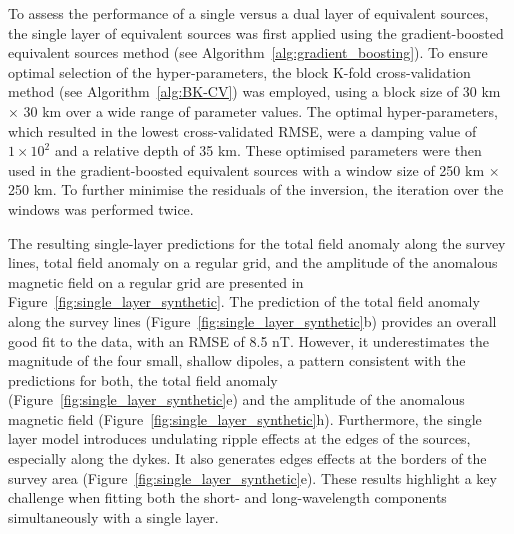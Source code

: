 To assess the performance of a single versus a dual layer of equivalent sources, the single layer of equivalent sources was first applied using the gradient-boosted equivalent sources method (see Algorithm~\ref{alg:gradient_boosting}). To ensure optimal selection of the hyper-parameters, the block K-fold cross-validation method (see Algorithm~\ref{alg:BK-CV}) was employed, using a block size of 30 km $\times$ 30 km over a wide range of parameter values. The optimal hyper-parameters, which resulted in the lowest cross-validated RMSE, were a damping value of $1 \times 10^{2}$ and a relative depth of 35 km. These optimised parameters were then used in the gradient-boosted equivalent sources with a window size of 250 km $\times$ 250 km. To further minimise the residuals of the inversion, the iteration over the windows was performed twice.

The resulting single-layer predictions for the total field anomaly along the survey lines, total field anomaly on a regular grid, and the amplitude of the anomalous magnetic field on a regular grid are presented in Figure~\ref{fig:single_layer_synthetic}. The prediction of the total field anomaly along the survey lines (Figure~\ref{fig:single_layer_synthetic}b) provides an overall good fit to the data, with an RMSE of 8.5 nT. However, it underestimates the magnitude of the four small, shallow dipoles, a pattern consistent with the predictions for both, the total field anomaly (Figure~\ref{fig:single_layer_synthetic}e) and the amplitude of the anomalous magnetic field (Figure~\ref{fig:single_layer_synthetic}h). Furthermore, the single layer model introduces undulating ripple effects at the edges of the sources, especially along the dykes. It also generates edges effects at the borders of the survey area (Figure~\ref{fig:single_layer_synthetic}e). These results highlight a key challenge when fitting both the short- and long-wavelength components simultaneously with a single layer.

